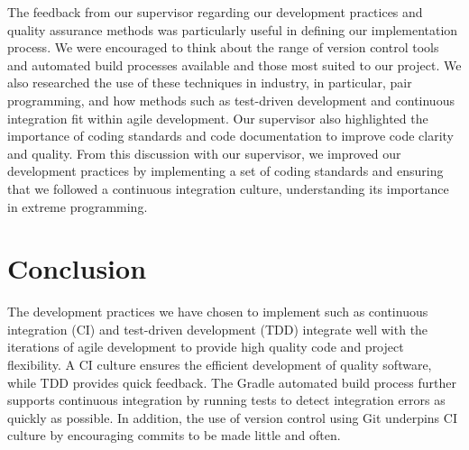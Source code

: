 \documentclass[10pt, a4paper]{article}
\begin{document}
The feedback from our supervisor regarding our development practices and quality assurance methods was particularly useful in defining our implementation process. We were encouraged to think about the range of version control tools and automated build processes available and those most suited to our project. We also researched the use of these techniques in industry, in particular, pair programming, and how methods such as test-driven development and continuous integration fit within agile development. Our supervisor also highlighted the importance of coding standards and code documentation to improve code clarity and quality. From this discussion with our supervisor, we improved our development practices by implementing a set of coding standards and ensuring that we followed a continuous integration culture, understanding its importance in extreme programming. 

\section{Conclusion}

The development practices we have chosen to implement such as  continuous integration (CI) and test-driven development (TDD) integrate well with the iterations of agile development to provide high quality code and project flexibility. A CI culture ensures the efficient development of quality software, while TDD provides quick feedback. The Gradle automated build process further supports continuous integration by running tests to detect integration errors as quickly as possible. In addition, the use of version control using Git underpins CI culture by encouraging commits to be made little and often.
\end{document}
